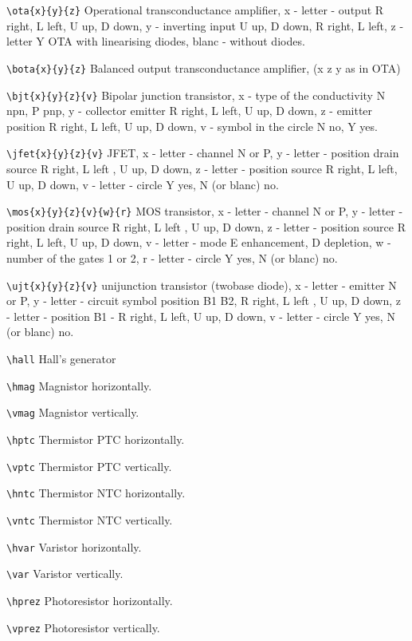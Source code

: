 \noindent
\verb?\ota{x}{y}{z}?
Operational transconductance amplifier,
x - letter - output R right, L left,
U up, D down, y - inverting input U up, D down, R
right, L left, z - letter Y OTA with linearising diodes, blanc -
without diodes.

\noindent
\verb?\bota{x}{y}{z}?
Balanced output transconductance amplifier, (x z y as in OTA)

\noindent
\verb?\bjt{x}{y}{z}{v}?
Bipolar junction transistor, x - type of the conductivity
N npn, P pnp, y -
collector emitter R right, L left, U up, D down, z - emitter position
R right, L left, U up, D down, v - symbol in the circle N no, Y yes.


\noindent
\verb?\jfet{x}{y}{z}{v}?
JFET, x - letter - channel N or P, y - letter
- position drain source R right, L left , U up, D down, z
- letter - position source R right, L left, U up, D down, v -
letter - circle Y yes, N (or blanc) no.


\noindent
\verb?\mos{x}{y}{z}{v}{w}{r}?
MOS transistor, x - letter - channel N or P, y - letter
- position drain source R right, L left , U up, D down, z
- letter - position source R right, L left, U up, D down, v -
letter - mode E enhancement, D depletion, w - number of the gates
1 or 2, r - letter - circle Y yes, N (or blanc) no.

\noindent
\verb?\ujt{x}{y}{z}{v}?
unijunction transistor (twobase diode),
x - letter - emitter N or P, y - letter
- circuit symbol position B1 B2, R right, L left , U up, D down, z
- letter - position B1 - R right, L left, U up, D down, v -
letter - circle Y yes, N (or blanc) no.

\noindent
\verb?\hall?
Hall's generator

\noindent
\verb?\hmag?
Magnistor horizontally.

\noindent
\verb?\vmag?
Magnistor vertically.

\noindent
\verb?\hptc?
Thermistor PTC horizontally.

\noindent
\verb?\vptc?
Thermistor PTC vertically.

\noindent
\verb?\hntc?
Thermistor NTC horizontally.

\noindent
\verb?\vntc?
Thermistor NTC vertically.

\noindent
\verb?\hvar?
Varistor horizontally.

\noindent
\verb?\var?
Varistor vertically.

\noindent
\verb?\hprez?
Photoresistor horizontally.

\noindent
\verb?\vprez?
Photoresistor vertically.

